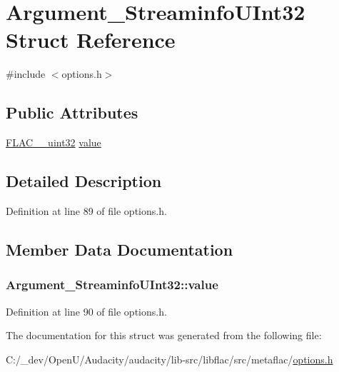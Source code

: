 \hypertarget{struct_argument___streaminfo_u_int32}{}\section{Argument\+\_\+\+Streaminfo\+U\+Int32 Struct Reference}
\label{struct_argument___streaminfo_u_int32}


{\ttfamily \#include $<$options.\+h$>$}

\subsection*{Public Attributes}
\begin{DoxyCompactItemize}
\item 
\hyperlink{ordinals_8h_a9c4005ea7ef8d564b0cc993cdd0e4e5e}{F\+L\+A\+C\+\_\+\+\_\+uint32} \hyperlink{struct_argument___streaminfo_u_int32_a2b18cddac29ee9b4aa0ef4706e911ee4}{value}
\end{DoxyCompactItemize}


\subsection{Detailed Description}


Definition at line 89 of file options.\+h.



\subsection{Member Data Documentation}
\subsubsection[{\texorpdfstring{value}{value}}]{ Argument\+\_\+\+Streaminfo\+U\+Int32\+::value}\hypertarget{struct_argument___streaminfo_u_int32_a2b18cddac29ee9b4aa0ef4706e911ee4}{}\label{struct_argument___streaminfo_u_int32_a2b18cddac29ee9b4aa0ef4706e911ee4}


Definition at line 90 of file options.\+h.



The documentation for this struct was generated from the following file\+:\begin{DoxyCompactItemize}
\item 
C\+:/\+\_\+dev/\+Open\+U/\+Audacity/audacity/lib-\/src/libflac/src/metaflac/\hyperlink{libflac_2src_2metaflac_2options_8h}{options.\+h}\end{DoxyCompactItemize}
